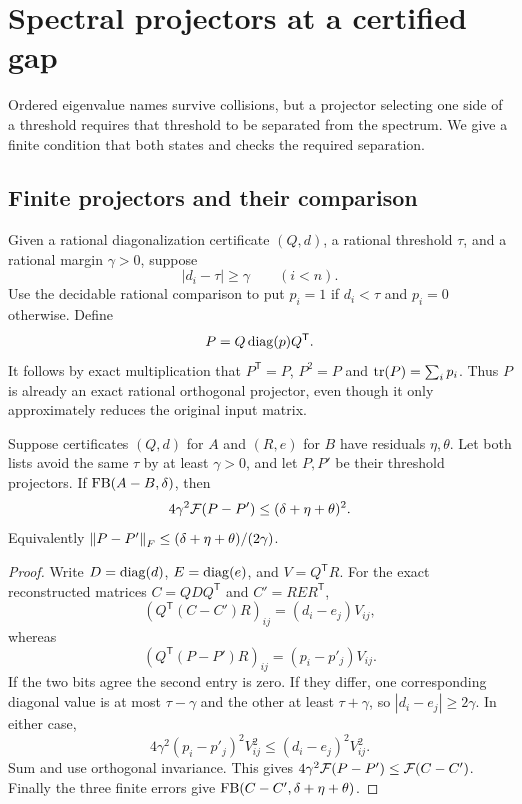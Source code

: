\section{Spectral projectors at a certified gap}
\label{sec:projectors}

Ordered eigenvalue names survive collisions, but a projector selecting one side of a threshold requires that threshold to be separated from the spectrum. We give a finite condition that both states and checks the required separation.

\subsection{Finite projectors and their comparison}

Given a rational diagonalization certificate $(Q,d)$, a rational threshold $\tau$, and a rational margin $\gamma>0$, suppose
\[
 |d_i-\tau|\ge\gamma\qquad(i<n).
\]
Use the decidable rational comparison to put $p_i=1$ if $d_i<\tau$ and $p_i=0$ otherwise. Define
\[
 P=Q\operatorname{diag}(p)Q^{\mathsf T}.
\]
It follows by exact multiplication that $P^{\mathsf T}=P$, $P^2=P$ and $\operatorname{tr}(P)=\sum_i p_i$. Thus $P$ is already an exact rational orthogonal projector, even though it only approximately reduces the original input matrix.

\begin{theorem}
\label{thm:projector}
Suppose certificates $(Q,d)$ for $A$ and $(R,e)$ for $B$ have residuals $\eta,\theta$. Let both lists avoid the same $\tau$ by at least $\gamma>0$, and let $P,P'$ be their threshold projectors. If $\operatorname{FB}(A-B,\delta)$, then
\begin{equation}
 4\gamma^2\mathcal F(P-P')\le(\delta+\eta+\theta)^2.
 \label{eq:projector}
\end{equation}
Equivalently $\left\lVert P-P'\right\rVert_F\le(\delta+\eta+\theta)/(2\gamma)$.
\end{theorem}
\begin{proof}
Write $D=\operatorname{diag}(d)$, $E=\operatorname{diag}(e)$, and $V=Q^{\mathsf T}R$. For the exact reconstructed matrices $C=QDQ^{\mathsf T}$ and $C'=RER^{\mathsf T}$,
\[
 (Q^{\mathsf T}(C-C')R)_{ij}=(d_i-e_j)V_{ij},
\]
whereas
\[
 (Q^{\mathsf T}(P-P')R)_{ij}=(p_i-p'_j)V_{ij}.
\]
If the two bits agree the second entry is zero. If they differ, one corresponding diagonal value is at most $\tau-\gamma$ and the other at least $\tau+\gamma$, so $|d_i-e_j|\ge2\gamma$. In either case,
\[
 4\gamma^2(p_i-p'_j)^2V_{ij}^2
 \le(d_i-e_j)^2V_{ij}^2.
\]
Sum and use orthogonal invariance. This gives
$4\gamma^2\mathcal F(P-P')\le\mathcal F(C-C')$.
Finally the three finite errors give
$\operatorname{FB}(C-C',\delta+\eta+\theta)$.
\end{proof}

